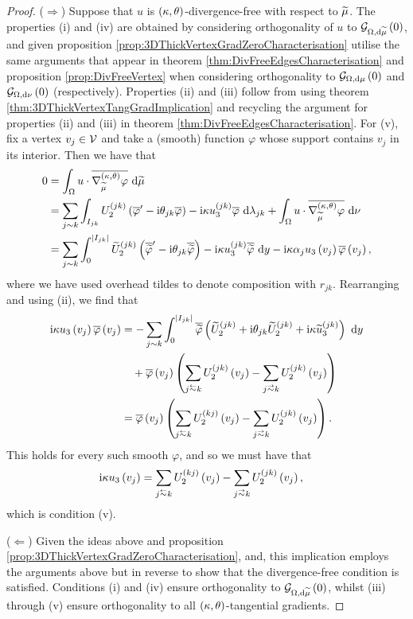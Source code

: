 \begin{proof}
	($\Rightarrow$) Suppose that $u$ is $\left( \kappa, \theta \right)$-divergence-free with respect to $\widetilde{\mu}$.
	The properties (i) and (iv) are obtained by considering orthogonality of $u$ to $\mathcal{G}_{ \Omega, \mathrm{d}\widetilde{\mu}}\left( 0 \right)$, and given proposition \ref{prop:3DThickVertexGradZeroCharacterisation} utilise the same arguments that appear in theorem \ref{thm:DivFreeEdgesCharacterisation} and proposition \ref{prop:DivFreeVertex} when considering orthogonality to $\mathcal{G}_{ \Omega, \mathrm{d}\mu}\left( 0 \right)$ and $\mathcal{G}_{ \Omega, \mathrm{d}\nu}\left( 0 \right)$ (respectively).
	Properties (ii) and (iii) follow from using theorem \ref{thm:3DThickVertexTangGradImplication} and recycling the argument for properties (ii) and (iii) in theorem \ref{thm:DivFreeEdgesCharacterisation}.
	For (v), fix a vertex $v_j\in\mathcal{V}$ and take a (smooth) function $\varphi$ whose support contains $v_j$ in its interior.
	Then we have that
	\begin{align*}
		0 &= \int_{\Omega} u\cdot\overline{\nabla^{\left( \kappa, \theta \right)}_{\widetilde{\mu}}\varphi}  \ \mathrm{d}\widetilde{\mu} \\
		&= \sum_{j\sim k}\int_{I_{jk}} U_2^{(jk)}\left( \overline{\varphi}' - \mathrm{i}\theta_{jk}\overline{\varphi} \right) - \mathrm{i}\kappa u_3^{(jk)}\overline{\varphi}  \ \mathrm{d}\lambda_{jk} + \int_{\Omega} u\cdot\overline{\nabla^{\left( \kappa, \theta \right)}_{\widetilde{\mu}}\varphi}  \ \mathrm{d}\nu \\
		&= \sum_{j\sim k}\int_0^{\left\lvert I_{jk} \right\rvert} \widetilde{U}_2^{(jk)}\left( \overline{\widetilde{\varphi}}' - \mathrm{i}\theta_{jk}\overline{\widetilde{\varphi}} \right) - \mathrm{i}\kappa u_3^{(jk)}\overline{\widetilde{\varphi}} \ \mathrm{d} y
		-\mathrm{i}\kappa\alpha_j u_3\left( v_j \right)\overline{\varphi}\left( v_j \right),
	\end{align*}
	where we have used overhead tildes to denote composition with $r_{jk}$.
	Rearranging and using (ii), we find that
	\begin{align*}
		\rmi\wavenumber u_3\bracs{v_j}\overline{\varphi}\bracs{v_j}
		&= - \sum_{j\con k}\int_0^{\abs{I_{jk}}} \overline{\widetilde{\varphi}}\bracs{ \widetilde{U}_2^{(jk)} + \rmi\qm_{jk}\widetilde{U}_2^{(jk)} + \rmi\wavenumber\widetilde{u}_3^{(jk)} } \ \md y \\
		&\quad + \overline{\varphi}\bracs{v_j}\bracs{ \sum_{j\conRight k} U_2^{(jk)}\bracs{v_j} - \sum_{j\conLeft k} U_2^{(jk)}\bracs{v_j} } \\
		&= \overline{\varphi}\bracs{v_j}\bracs{ \sum_{j\conRight k} U_2^{(kj)}\bracs{v_j} - \sum_{j\conLeft k} U_2^{(jk)}\bracs{v_j} }.
	\end{align*}
	This holds for every such smooth $\varphi$, and so we must have that
	\begin{align*}
		\rmi\wavenumber u_3\bracs{v_j} &= \sum_{j\conRight k} U_2^{(kj)}\bracs{v_j} - \sum_{j\conLeft k} U_2^{(jk)}\bracs{v_j},
	\end{align*}
	which is condition (v).
	
	($\Leftarrow$) Given the ideas above and proposition \ref{prop:3DThickVertexGradZeroCharacterisation}, and, this implication employs the arguments above but in reverse to show that the divergence-free condition is satisfied. 
	Conditions (i) and (iv) ensure orthogonality to $\mathcal{G}_{ \Omega, \mathrm{d}\widetilde{\mu}}\left( 0 \right)$, whilst (iii) through (v) ensure orthogonality to all $\left( \kappa, \theta \right)$-tangential gradients.
\end{proof}

